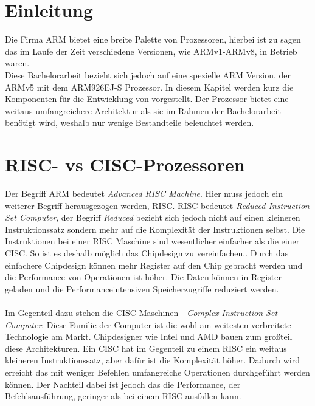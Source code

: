 \section{Einleitung}
Die Firma ARM bietet eine breite Palette von Prozessoren, hierbei ist zu sagen das im Laufe der Zeit verschiedene Versionen, wie ARMv1-ARMv8, in Betrieb waren. \\
Diese Bachelorarbeit bezieht sich jedoch auf eine spezielle ARM Version, der ARMv5 mit dem ARM926EJ-S Prozessor. In diesem Kapitel werden kurz die Komponenten f\"ur die Entwicklung von \mops vorgestellt. Der Prozessor bietet eine weitaus umfangreichere Architektur als sie im Rahmen der Bachelorarbeit ben\"otigt wird, weshalb nur wenige Bestandteile beleuchtet werden.
\section{RISC- vs CISC-Prozessoren}
Der Begriff ARM bedeutet \textit{Advanced RISC Machine}. Hier muss jedoch ein weiterer Begriff herausgezogen werden, RISC. RISC bedeutet \textit{Reduced Instruction Set Computer}, der Begriff \textit{Reduced} bezieht sich jedoch nicht auf einen kleineren Instruktionssatz sondern mehr auf die Komplexit\"at der Instruktionen selbst. Die Instruktionen bei einer RISC Maschine sind wesentlicher einfacher als die einer CISC. So ist es deshalb m\"oglich das Chipdesign zu vereinfachen.. Durch das einfachere Chipdesign k\"onnen mehr Register auf den Chip gebracht werden und die Performance von Operationen ist h\"oher. Die Daten k\"onnen in  Register geladen und die Performanceintensiven Speicherzugriffe reduziert werden.\\\\
Im Gegenteil dazu stehen die CISC Maschinen - \textit{Complex Instruction Set Computer}. Diese Familie der Computer ist die wohl am weitesten verbreitete Technologie am Markt. Chipdesigner wie Intel und AMD bauen zum gro\ss teil diese Architekturen. Ein CISC hat im Gegenteil zu einem RISC ein weitaus kleineren Instruktionssatz, aber daf\"ur ist die Komplexit\"at h\"oher. Dadurch wird erreicht das mit weniger Befehlen umfangreiche Operationen durchgef\"uhrt werden k\"onnen. Der Nachteil dabei ist jedoch das die Performance, der Befehlsausf\"uhrung, geringer als bei einem RISC ausfallen kann.\\
